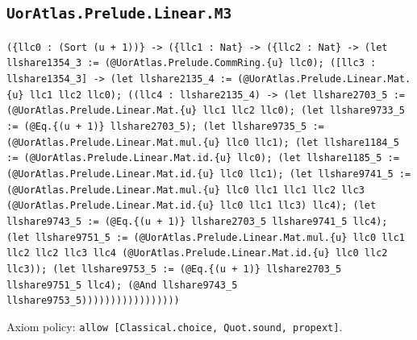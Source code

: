 \documentclass[11pt]{article}
\begin{document}
\subsection*{\texttt{UorAtlas.Prelude.Linear.M3}}
\noindent\texttt{(\{llc0 : (Sort (u + 1))\} -> (\{llc1 : Nat\} -> (\{llc2 : Nat\} -> (let llshare1354\_3 := (@UorAtlas.Prelude.CommRing.\{u\} llc0); ([llc3 : llshare1354\_3] -> (let llshare2135\_4 := (@UorAtlas.Prelude.Linear.Mat.\{u\} llc1 llc2 llc0); ((llc4 : llshare2135\_4) -> (let llshare2703\_5 := (@UorAtlas.Prelude.Linear.Mat.\{u\} llc1 llc2 llc0); (let llshare9733\_5 := (@Eq.\{(u + 1)\} llshare2703\_5); (let llshare9735\_5 := (@UorAtlas.Prelude.Linear.Mat.mul.\{u\} llc0 llc1); (let llshare1184\_5 := (@UorAtlas.Prelude.Linear.Mat.id.\{u\} llc0); (let llshare1185\_5 := (@UorAtlas.Prelude.Linear.Mat.id.\{u\} llc0 llc1); (let llshare9741\_5 := (@UorAtlas.Prelude.Linear.Mat.mul.\{u\} llc0 llc1 llc1 llc2 llc3 (@UorAtlas.Prelude.Linear.Mat.id.\{u\} llc0 llc1 llc3) llc4); (let llshare9743\_5 := (@Eq.\{(u + 1)\} llshare2703\_5 llshare9741\_5 llc4); (let llshare9751\_5 := (@UorAtlas.Prelude.Linear.Mat.mul.\{u\} llc0 llc1 llc2 llc2 llc3 llc4 (@UorAtlas.Prelude.Linear.Mat.id.\{u\} llc0 llc2 llc3)); (let llshare9753\_5 := (@Eq.\{(u + 1)\} llshare2703\_5 llshare9751\_5 llc4); (@And llshare9743\_5 llshare9753\_5)))))))))))))))))}\par
\noindent Axiom policy: \texttt{allow [Classical.choice, Quot.sound, propext]}.\par
\end{document}
